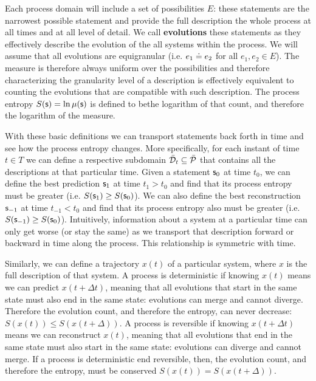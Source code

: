 \documentclass[10pt, onecolumn, longbibliography, nofootinbib]{revtex4-2}
\begin{document}
Each process domain will include a set of possibilities $E$: these statements are the narrowest possible statement and provide the full description the whole process at all times and at all level of detail. We call \textbf{evolutions} these statements as they effectively describe the evolution of the all systems within the process. We will assume that all evolutions are equigranular (i.e. $e_1 \eqgran e_2$ for all $e_1, e_2 \in E$). The measure is therefore always uniform over the possibilities and therefore characterizing the granularity level of a description is effectively equivalent to counting the evolutions that are compatible with such description. The process entropy $S(\stmt) = \ln \mu (\stmt)$ is defined to bethe logarithm of that count, and therefore the logarithm of the measure.

With these basic definitions we can transport statements back forth in time and see how the process entropy changes. More specifically, for each instant of time $t \in T$ we can define a respective subdomain $\tdomain_t \subseteq \tdomain[P]$ that contains all the descriptions at that particular time. Given a statement $\stmt_0$ at time $t_0$, we can define the best prediction $\stmt_1$ at time $t_1 > t_0$ and find that its process entropy must be greater (i.e. $S(\stmt_1) \geq S(\stmt_0)$). We can also define the best reconstruction $\stmt_{-1}$ at time $t_{-1} < t_0$ and find that its process entropy also must be greater (i.e. $S(\stmt_{-1}) \geq S(\stmt_0)$). Intuitively, information about a system at a particular time can only get worse (or stay the same) as we transport that description forward or backward in time along the process. This relationship is symmetric with time.

Similarly, we can define a trajectory $x(t)$ of a particular system, where $x$ is the full description of that system. A process is deterministic if knowing $x(t)$ means we can predict $x(t + \Delta t)$, meaning that all evolutions that start in the same state must also end in the same state: evolutions can merge and cannot diverge. Therefore the evolution count, and therefore the entropy, can never decrease: $S(x(t)) \leq S(x(t+\Delta))$. A process is reversible if knowing $x(t + \Delta t)$ means we can reconstruct $x(t)$, meaning that all evolutions that end in the same state must also start in the same state: evolutions can diverge and cannot merge. If a process is deterministic end reversible, then, the evolution count, and therefore the entropy, must be conserved $S(x(t)) = S(x(t+\Delta))$.
\end{document}
